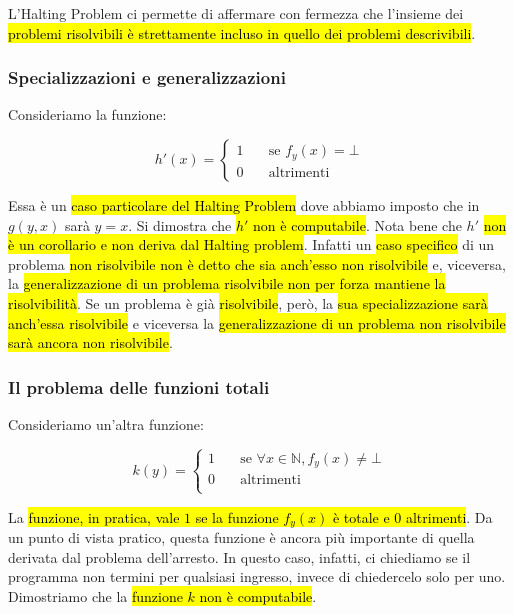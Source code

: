 \documentclass[a4paper,11pt,twoside]{article}
\theoremstyle{plain}
\theoremstyle{definition}
\theoremstyle{remark}
\begin{document}
L'Halting Problem ci permette di affermare con fermezza che l'insieme dei
\hl{problemi risolvibili è strettamente incluso in quello dei problemi
descrivibili}.

\subsubsection{Specializzazioni e generalizzazioni}\label{sec:spec-gen}

Consideriamo la funzione:

\begin{equation}
  h'(x) =
  \begin{cases}
    1 & \quad \text{se } f_y(x) = \bot \\
    0 & \quad \text{altrimenti}
  \end{cases}
\end{equation}

Essa è un \hl{caso particolare del Halting Problem} dove abbiamo imposto che in
$g(y,x)$ sarà $y=x$. Si dimostra che \hl{$h'$ non è computabile}. Nota bene che
$h'$ \hl{non è un corollario e non deriva dal Halting problem}. Infatti un
\hl{caso specifico} di un problema \hl{non risolvibile non è detto che sia
anch'esso non risolvibile} e, viceversa, la \hl{generalizzazione di un problema
risolvibile non per forza mantiene la risolvibilità}. Se un problema è già
\hl{risolvibile}, però, la \hl{sua specializzazione sarà anch'essa risolvibile}
e viceversa la \hl{generalizzazione di un problema non risolvibile sarà ancora
non risolvibile}.

\subsubsection{Il problema delle funzioni totali}\label{sec:func-tot}

Consideriamo un'altra funzione:

\begin{equation}\label{eqn:func-k}
  k(y) =
  \begin{cases}
    1 & \quad \text{se } \forall x \in \mathbb{N}, f_y(x) \neq \bot\\
    0 & \quad \text{altrimenti}\\
  \end{cases}
\end{equation}

La \hl{funzione, in pratica, vale $1$ se la funzione $f_y(x)$ è totale e 0
altrimenti}. Da un punto di vista pratico, questa funzione è ancora più
importante di quella derivata dal problema dell'arresto. In questo caso,
infatti, ci chiediamo se il programma non termini per qualsiasi ingresso, invece
di chiedercelo solo per uno. Dimostriamo che la \hl{funzione $k$ non è
computabile}.
\end{document}
